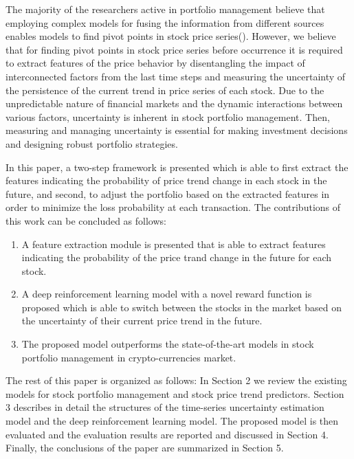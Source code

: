 The majority of the researchers active in portfolio management believe that employing complex models for fusing the information from different sources enables models to find pivot points in stock price series(\cite{thakkar2021fusion}). However, we believe that for finding pivot points in stock price series before occurrence it is required to extract features of the price behavior by disentangling the impact of interconnected factors from the last time steps and measuring the uncertainty of the persistence of the current trend in price series of each stock. Due to the unpredictable nature of financial markets and the dynamic interactions between various factors, uncertainty is inherent in stock portfolio management. Then, measuring and managing uncertainty is essential for making investment decisions and designing robust portfolio strategies. 

In this paper, a two-step framework is presented which is able to first extract the features indicating the probability of price trend change in each stock in the future, and second, to adjust the portfolio based on the extracted features in order to minimize the loss probability at each transaction. The contributions of this work can be concluded as follows:


\begin{enumerate}
	\item A feature extraction module is presented that is able to extract features indicating the probability of the price trand change in the future for each stock.
	\item A deep reinforcement learning model with a novel reward function is proposed which is able to switch between the stocks in the market based on the uncertainty of their current price trend in the future.
	\item The proposed model outperforms the state-of-the-art models in stock portfolio management in crypto-currencies market.
\end{enumerate}

The rest of this paper is organized as follows: In Section 2 we review the existing models for stock portfolio management and stock price trend predictors. Section 3 describes in detail the structures of the time-series uncertainty estimation model and the deep reinforcement learning model. The proposed model is then evaluated and the evaluation results are reported and discussed in Section 4. Finally, the conclusions of the paper are summarized in Section 5.